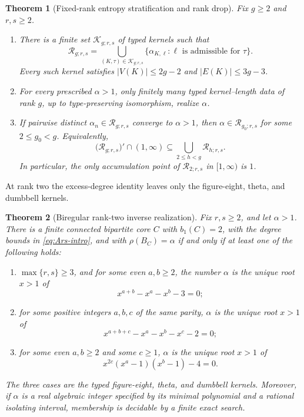 \documentclass[11pt]{amsart}
\theoremstyle{plain}
\newtheorem{theorem}{Theorem}[section]
\theoremstyle{definition}
\theoremstyle{remark}
\begin{document}
\begin{theorem}[Fixed-rank entropy stratification and rank drop]
\label{thm:intro-fixed-rank}
Fix \(g\geq2\) and \(r,s\geq2\).
\begin{enumerate}[label=\textup{(\roman*)}]
  \item There is a finite set \(\mathcal K_{g;r,s}\) of typed kernels such
  that
  \[
    \mathcal R_{g;r,s}
    =\bigcup_{(K,\tau)\in\mathcal K_{g;r,s}}
      \{\alpha_{K,\ell}:\ell\text{ is admissible for }\tau\}.
  \]
  Every such kernel satisfies
  \(|V(K)|\leq2g-2\) and \(|E(K)|\leq3g-3\).

  \item For every prescribed \(\alpha>1\), only finitely many typed
  kernel--length data of rank \(g\), up to type-preserving isomorphism,
  realize \(\alpha\).

  \item If pairwise distinct \(\alpha_n\in\mathcal R_{g;r,s}\) converge
  to \(\alpha>1\), then
  \(\alpha\in\mathcal R_{g_0;r,s}\) for some \(2\leq g_0<g\).  Equivalently,
  \begin{equation}\label{eq:intro-derived-set}
    \bigl(\mathcal R_{g;r,s}\bigr)'\cap(1,\infty)
    \subseteq\bigcup_{2\leq h<g}\mathcal R_{h;r,s}.
  \end{equation}
  In particular, the only accumulation point of
  \(\mathcal R_{2;r,s}\) in \([1,\infty)\) is \(1\).
\end{enumerate}
\end{theorem}

At rank two the excess-degree identity leaves only the figure-eight, theta,
and dumbbell kernels.

\begin{theorem}[Biregular rank-two inverse realization]
\label{thm:intro-rank-two}
Fix \(r,s\geq2\), and let \(\alpha>1\).  There is a finite connected bipartite core \(C\) with
\(b_1(C)=2\), with the degree bounds in \eqref{eq:Ars-intro}, and with
\(\rho(B_C)=\alpha\) if and only if at least one of the following holds:
\begin{enumerate}[label=\textup{(\roman*)}]
  \item \(\max\{r,s\}\geq3\), and for some even \(a,b\geq2\), the number
  \(\alpha\) is the unique root \(x>1\) of
  \[
    x^{a+b}-x^a-x^b-3=0;
  \]
  \item for some positive integers \(a,b,c\) of the same parity,
  \(\alpha\) is the unique root \(x>1\) of
  \[
    x^{a+b+c}-x^a-x^b-x^c-2=0;
  \]
  \item for some even \(a,b\geq2\) and some \(c\geq1\), \(\alpha\) is the
  unique root \(x>1\) of
  \[
    x^{2c}(x^a-1)(x^b-1)-4=0.
  \]
\end{enumerate}
The three cases are the typed figure-eight, theta, and dumbbell kernels.
Moreover, if \(\alpha\) is a real algebraic integer specified by its
minimal polynomial and a rational isolating interval, membership is decidable
by a finite exact search.
\end{theorem}
\end{document}
